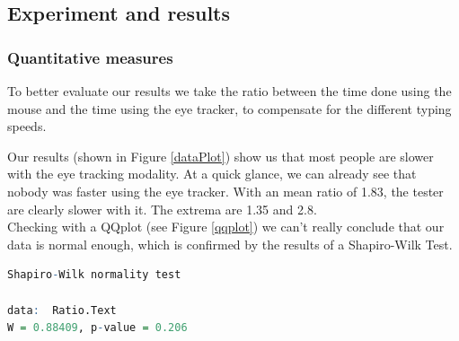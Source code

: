\documentclass[12pt, a4paper]{article}
\begin{document}
\subsection{Experiment and results}

\subsubsection{Quantitative measures}
To better evaluate our results we take the ratio between the time done using the mouse and the time using the eye tracker, to compensate for the different typing speeds.

Our results (shown in Figure \ref{dataPlot}) show us that most people are slower with the eye tracking modality. 
At a quick glance, we can already see that nobody was faster using the eye tracker. With an mean ratio of 1.83, the tester are clearly slower with it. The extrema are 1.35 and 2.8. \\
Checking with a QQplot (see Figure \ref{qqplot}) we can't really conclude that our data is normal enough, which is confirmed by the results of a Shapiro-Wilk  Test.
\begin{lstlisting}[frame=single, language=R]
	Shapiro-Wilk normality test

data:  Ratio.Text
W = 0.88409, p-value = 0.206
\end{lstlisting}
\end{document}

